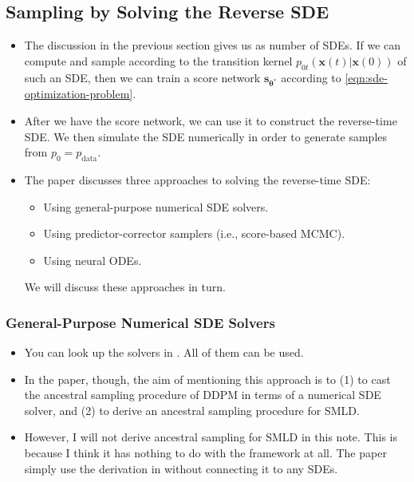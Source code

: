 \documentclass[10pt]{article}
\newcommand{\ve}[1]{\mathbf{#1}}
\newcommand{\mrm}[1]{\mathrm{#1}}
\newcommand{\ves}[1]{\boldsymbol{#1}}
\begin{document}
\subsection{Sampling by Solving the Reverse SDE}

\begin{itemize}
  \item The discussion in the previous section gives us as number of SDEs. If we can compute and sample according to the transition kernel $p_{0t}(\ve{x}(t)|\ve{x}(0))$ of such an SDE, then we can train a score network $\ve{s}_{\ves{\theta}^*}$ according to \eqref{eqn:sde-optimization-problem}.
  
  \item After we have the score network, we can use it to construct the reverse-time SDE. We then simulate the SDE numerically in order to generate samples from $p_0 = p_{\mrm{data}}$.
  
  \item The paper discusses three approaches to solving the reverse-time SDE:
  \begin{itemize}
    \item Using general-purpose numerical SDE solvers.
    \item Using predictor-corrector samplers (i.e., score-based MCMC).
    \item Using neural ODEs.
  \end{itemize}
  We will discuss these approaches in turn.  
\end{itemize}

\subsubsection{General-Purpose Numerical SDE Solvers}

\begin{itemize}
  \item You can look up the solvers in \cite{Kloeden:2013}. All of them can be used.
  
  \item In the paper, though, the aim of mentioning this approach is to (1) to cast the ancestral sampling procedure of DDPM in terms of a numerical SDE solver, and (2) to derive an ancestral sampling procedure for SMLD.
  
  \item However, I will not derive ancestral sampling for SMLD in this note. This is because I think it has nothing to do with the framework at all. The paper simply use the derivation in \cite{Ho:2020} without connecting it to any SDEs.  
\end{itemize}
\end{document}

